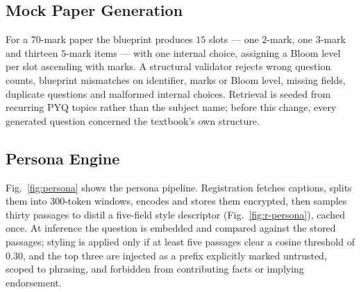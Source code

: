 \documentclass[conference]{IEEEtran}
\begin{document}
\subsection{Mock Paper Generation}
For a $70$-mark paper the blueprint produces $15$ slots --- one $2$-mark, one
$3$-mark and thirteen $5$-mark items --- with one internal choice, assigning a
Bloom level per slot ascending with marks. A structural validator rejects wrong
question counts, blueprint mismatches on identifier, marks or Bloom level,
missing fields, duplicate questions and malformed internal choices. Retrieval is
seeded from recurring PYQ topics rather than the subject name; before this
change, every generated question concerned the textbook's own structure.

\subsection{Persona Engine}
\label{sec:persona}
Fig.~\ref{fig:persona} shows the persona pipeline. Registration fetches
captions, splits them into $300$-token windows, encodes and stores them
encrypted, then samples thirty passages to distil a five-field style descriptor
(Fig.~\ref{fig:r-persona}), cached once. At inference the question is embedded
and compared against the stored passages; styling is applied only if at least
five passages clear a cosine threshold of $0.30$, and the top three are injected
as a prefix explicitly marked untrusted, scoped to phrasing, and forbidden from
contributing facts or implying endorsement.
\end{document}
